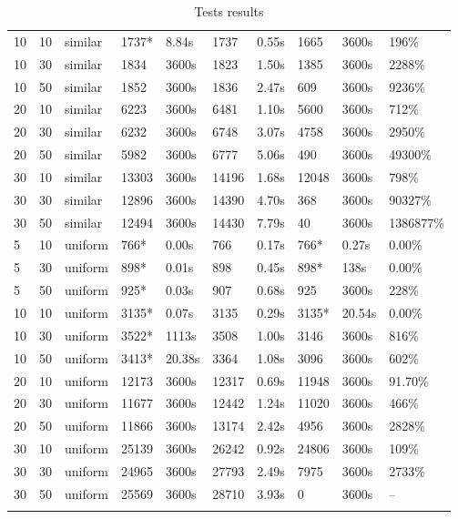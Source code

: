 \begin{scriptsize}
\begin{longtable}{@{\extracolsep{\fill}}l|l|l|ll|ll|lll@{}}
 10 & 10 & similar& 1737*& 8.84s& 1737& 0.55s & 1665& 3600s& 196\% \\
 10 & 30 & similar& 1834& 3600s& 1823& 1.50s & 1385& 3600s& 2288\% \\
 10 & 50 & similar& 1852& 3600s& 1836& 2.47s & 609& 3600s& 9236\% \\
 20 & 10 & similar& 6223& 3600s& 6481& 1.10s & 5600& 3600s& 712\% \\
 20 & 30 & similar& 6232& 3600s& 6748& 3.07s & 4758& 3600s& 2950\% \\
 20 & 50 & similar& 5982& 3600s& 6777& 5.06s & 490& 3600s& 49300\% \\
 30 & 10 & similar& 13303& 3600s& 14196& 1.68s & 12048& 3600s& 798\% \\
 30 & 30 & similar& 12896& 3600s& 14390& 4.70s & 368& 3600s& 90327\% \\
 30 & 50 & similar& 12494& 3600s& 14430& 7.79s & 40& 3600s& 1386877\% \\
 5 & 10 & uniform& 766*& 0.00s& 766& 0.17s & 766*& 0.27s & 0.00\% \\
 5 & 30 & uniform& 898*& 0.01s& 898& 0.45s & 898*& 138s & 0.00\% \\
 5 & 50 & uniform& 925*& 0.03s& 907& 0.68s & 925& 3600s& 228\% \\
 10 & 10 & uniform& 3135*& 0.07s& 3135& 0.29s & 3135*& 20.54s & 0.00\% \\
 10 & 30 & uniform& 3522*& 1113s & 3508& 1.00s & 3146& 3600s& 816\% \\
 10 & 50 & uniform& 3413*& 20.38s& 3364& 1.08s & 3096& 3600s& 602\% \\
 20 & 10 & uniform& 12173& 3600s& 12317& 0.69s & 11948& 3600s& 91.70\% \\
 20 & 30 & uniform& 11677& 3600s& 12442& 1.24s & 11020& 3600s& 466\% \\
 20 & 50 & uniform& 11866& 3600s& 13174& 2.42s & 4956& 3600s& 2828\% \\
 30 & 10 & uniform& 25139& 3600s& 26242& 0.92s & 24806& 3600s& 109\% \\
 30 & 30 & uniform& 24965& 3600s& 27793& 2.49s & 7975& 3600s& 2733\% \\
 30 & 50 & uniform& 25569& 3600s& 28710& 3.93s & 0& 3600s& -- \\
\hline 
\caption{Tests results}\\ 
\end{longtable}
\end{scriptsize}
